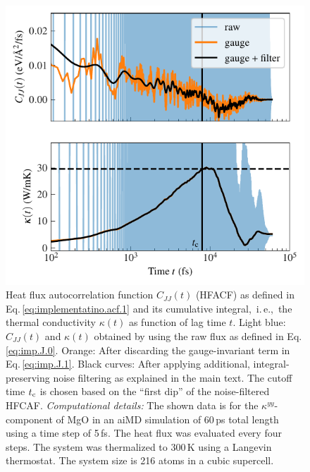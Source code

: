 \begin{figure}
	\includegraphics[width=\textwidth]{./data/plots/implementation/MgO/hfacf_data_yy_3.pdf}
	\caption{Heat flux autocorrelation function $C_{JJ}(t)$ (HFACF) as defined in Eq.\,\eqref{eq:implementatino.acf.1} and its cumulative integral,~i.\,e.,~the thermal conductivity $\kappa (t)$ as function of lag time $t$. Light blue: $C_{JJ}(t)$ and $\kappa (t)$ obtained by using the raw flux as defined in Eq.\,\eqref{eq:imp.J.0}. Orange: After discarding the gauge-invariant term in Eq.\,\eqref{eq:imp.J.1}. Black curves: After applying additional, integral-preserving noise filtering as explained in the main text. The cutoff time $t_{\rm c}$ is chosen based on the ``first dip'' of the noise-filtered HFCAF.
	\emph{Computational details:} The shown data is for the $\kappa^{yy}$-component of MgO in an aiMD simulation of 60\,ps total length using a time step of 5\,fs. The heat flux was evaluated every four steps. The system was thermalized to 300\,K using a Langevin thermostat. The system size is 216 atoms in a cubic supercell.}
	\label{fig:imp.hfacf.kappa.1}
\end{figure}

